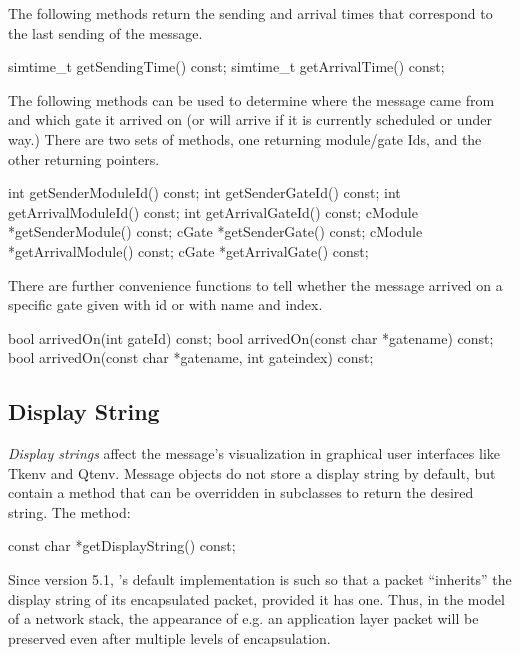 The following methods return the sending and arrival times that correspond
to the last sending of the message.

\begin{cpp}
simtime_t getSendingTime() const;
simtime_t getArrivalTime() const;
\end{cpp}

The following methods can be used to determine where the message came from
and which gate it arrived on (or will arrive if it is currently scheduled
or under way.) There are two sets of methods, one returning module/gate Ids,
and the other returning pointers.

\begin{cpp}
int getSenderModuleId() const;
int getSenderGateId() const;
int getArrivalModuleId() const;
int getArrivalGateId() const;
cModule *getSenderModule() const;
cGate *getSenderGate() const;
cModule *getArrivalModule() const;
cGate *getArrivalGate() const;
\end{cpp}

There are further convenience functions to tell whether
the message arrived on a specific gate given with id or
with name and index.

\begin{cpp}
bool arrivedOn(int gateId) const;
bool arrivedOn(const char *gatename) const;
bool arrivedOn(const char *gatename, int gateindex) const;
\end{cpp}


\subsection{Display String}
\label{sec:messages:displaystring}

\textit{Display strings} affect the message's visualization in graphical
user interfaces like Tkenv and Qtenv. Message objects do not store a
display string by default, but contain a  method
that can be overridden in subclasses to return the desired string.  The
method:

\begin{cpp}
const char *getDisplayString() const;
\end{cpp}

Since {\opp} version 5.1, 's default  
implementation is such so that a packet ``inherits'' the display string of its
encapsulated packet, provided it has one. Thus, in the model of a network stack,
the appearance of e.g. an application layer packet will be preserved even
after multiple levels of encapsulation.

